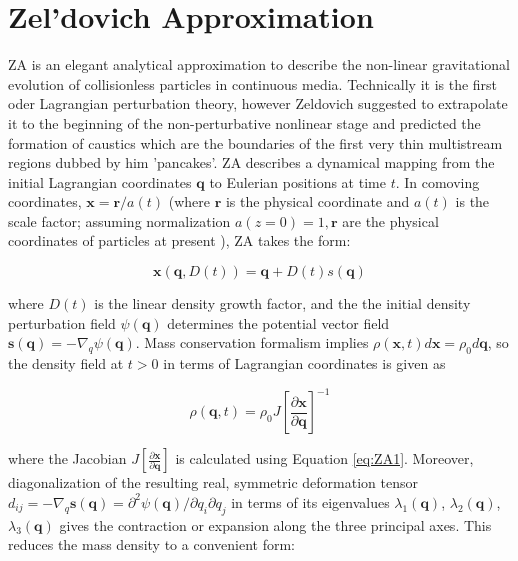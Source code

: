 \section{Zel'dovich Approximation}

\label{sec:ZA}

ZA is an elegant analytical approximation to describe the non-linear gravitational evolution of collisionless particles in continuous media. Technically it is the first oder Lagrangian perturbation theory, however Zeldovich suggested to extrapolate it to the beginning of the non-perturbative nonlinear stage and predicted the formation of caustics which are the boundaries of
the first very thin multistream regions dubbed by him  'pancakes'.
ZA describes a dynamical mapping from the initial Lagrangian coordinates $\mathbf{q}$ to Eulerian positions at time $t$. In comoving coordinates, $\mathbf{x} = \mathbf{r}/a(t)$ (where $\mathbf{r}$ is the physical coordinate  and $a(t)$ is the scale factor; assuming normalization $a(z=0)=1, \mathbf{r}$ are 
the physical coordinates of particles at present ), ZA takes the form:

\begin{equation} \label{eq:ZA1}
 \mathbf{x}(\mathbf{q}, D(t) ) = \mathbf{q} + D(t) s(\mathbf{q}) 
\end{equation}

where $D(t)$ is the linear density growth factor, and the the initial density perturbation field $\psi(\mathbf{q})$ determines the potential vector field $\mathbf{s(q)} = - \nabla_q \psi(\mathbf{q})$. 
Mass conservation formalism implies $\rho(\mathbf{x}, t) d\mathbf{x} = \rho_0 d\mathbf{q} $, so the density field at $t>0$ in terms of Lagrangian coordinates is given as 

\begin{equation}
 \rho(\mathbf{q}, t) = \rho_0 J \left[ \frac{\partial\mathbf{x}}{\partial\mathbf{q}} \right]^{-1}
\end{equation}

where the Jacobian $J \left[ \frac{\partial\mathbf{x}}{\partial\mathbf{q}} \right]$ is calculated using Equation \ref{eq:ZA1}. Moreover, diagonalization of the resulting real, symmetric deformation tensor $d_{ij} = - \nabla_q \mathbf{s(q)} =  \partial^2 \psi(\mathbf{q})/ \partial q_i \partial q_j$ in terms of its eigenvalues $\lambda_1(\mathbf{q})$, $\lambda_2(\mathbf{q})$, $\lambda_3(\mathbf{q})$ gives the contraction or expansion along the three principal axes. This reduces the mass density to a convenient form:

